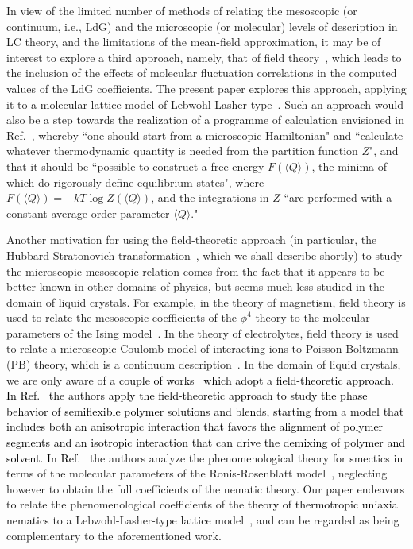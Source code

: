 \documentclass[jcp,aps,twocolumn,showpacs,supergroupedaddress,epsfig,amsmath,amssymb,eqsecnum]{revtex4}
\newcommand{\bing}[1]{\textcolor{black}{#1}}
\begin{document}
In view of the limited number of methods of relating the mesoscopic (or continuum, i.e., LdG) and the microscopic (or molecular) levels of description in LC theory, and the limitations of the mean-field approximation, it may be of interest to explore a third approach, namely, that of field theory~\cite{doi-edwards,fredrickson,edwards-lenard1962,lu2012,lu2013,polyakov,altland-simons}, which leads to the inclusion of the effects of molecular fluctuation correlations in the computed values of the LdG coefficients. The present paper explores this approach, applying it to a molecular lattice model of Lebwohl-Lasher type~\cite{lebwohl-lasher1972}. Such an approach would also be a step towards the realization of a programme of calculation envisioned in Ref.~\cite{degennes-prost}, whereby ``one should start from a microscopic Hamiltonian" and ``calculate whatever thermodynamic quantity is needed from the partition function $Z$", and that it should be ``possible to construct a free energy $F(\langle Q \rangle)$, the minima of which do rigorously define equilibrium states", where $F(\langle Q \rangle) = -k T \log Z(\langle Q \rangle)$, and the integrations in $Z$ ``are performed with a constant average order parameter $\langle Q \rangle$." 

Another motivation for using the field-theoretic approach (in particular, the Hubbard-Stratonovich transformation~\cite{stratonovich1958,hubbard1958,siegert1960}, which we shall describe shortly) to study the microscopic-mesoscopic relation comes from the fact that it appears to be better known in other domains of physics, but seems much less studied in the domain of liquid crystals. For example, in the theory of magnetism, field theory is used to relate the mesoscopic coefficients of the $\phi^4$ theory to the molecular parameters of the Ising model~\cite{polyakov,altland-simons}. In the theory of electrolytes, field theory is used to relate a microscopic Coulomb model of interacting ions to Poisson-Boltzmann (PB) theory, which is a continuum description~\cite{podgornik-zeks1988,podgornik1989a,podgornik1989b,netz-orland2000b,netz2001}. In the domain of liquid crystals, we are only aware of \bing{a couple of works~\cite{liu-fredrickson1993,drossinos1986} which adopt a field-theoretic approach. 
In Ref.~\cite{liu-fredrickson1993} the authors apply the field-theoretic approach to study the phase behavior of semiflexible polymer solutions and blends, starting from a model that includes both an anisotropic interaction that favors the alignment of polymer segments and an isotropic interaction that can drive the demixing of polymer and solvent. 
In Ref.~\cite{drossinos1986}} the authors analyze the phenomenological theory for smectics in terms of the molecular parameters of the Ronis-Rosenblatt model~\cite{ronis1980}, neglecting however to obtain the full coefficients of the nematic theory. 
Our paper endeavors to relate the phenomenological coefficients of the \bing{theory of thermotropic uniaxial nematics} to a Lebwohl-Lasher-type lattice model~\cite{footnote-lattice}, and can be regarded as being complementary to the aforementioned work. 
\end{document}
